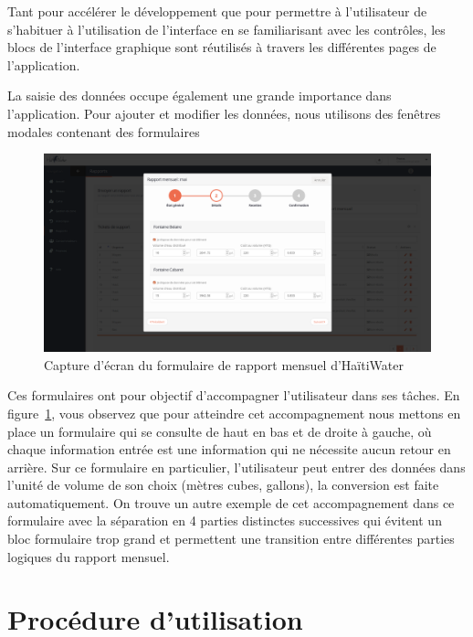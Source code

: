 \documentclass{EPL-master-thesis-covers-FR}
\begin{document}
			Tant pour accélérer le développement que pour permettre à l'utilisateur de s'habituer à l'utilisation de l'interface en se familiarisant avec les contrôles, les blocs de l'interface graphique sont réutilisés à travers les différentes pages de l'application.

			La saisie des données occupe également une grande importance dans l'application. Pour ajouter et modifier les données, nous utilisons des fenêtres modales contenant des formulaires

			\begin{figure}[H]
				\includegraphics[width=\textwidth]{images/screen_rapport_mensuel.png}
				\caption{Capture d'écran du formulaire de rapport mensuel d'HaïtiWater}
				\label{fig:screen_rapport_mensuel}
			\end{figure}

			Ces formulaires ont pour objectif d'accompagner l'utilisateur dans ses tâches. En figure~\ref{fig:screen_rapport_mensuel}, vous observez que pour atteindre cet accompagnement nous mettons en place un formulaire qui se consulte de haut en bas et de droite à gauche, où chaque information entrée est une information qui ne nécessite aucun retour en arrière. Sur ce formulaire en particulier, l'utilisateur peut entrer des données dans l'unité de volume de son choix (mètres cubes, gallons), la conversion est faite automatiquement. On trouve un autre exemple de cet accompagnement dans ce formulaire avec la séparation en 4 parties distinctes successives qui évitent un bloc formulaire trop grand et permettent une transition entre différentes parties logiques du rapport mensuel.


		\section{Procédure d'utilisation}
\end{document}
